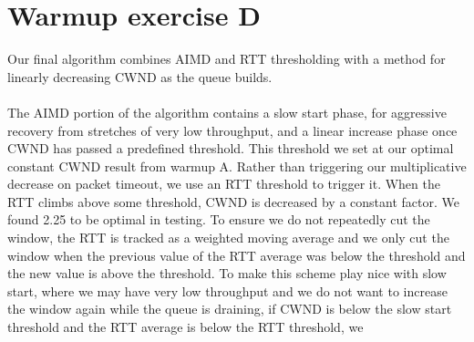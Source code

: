 \documentclass[12pt]{article}
\begin{document}
\section*{Warmup exercise D}
Our final algorithm combines AIMD and RTT thresholding with a method for linearly decreasing CWND as the queue builds. \\ 
\\
The AIMD portion of the algorithm contains a slow start phase, for aggressive recovery from stretches of very low throughput, and a linear increase phase once CWND has passed a predefined threshold. This threshold we set at our optimal constant CWND result from warmup A. Rather than triggering our multiplicative decrease on packet timeout, we use an RTT threshold to trigger it. When the RTT climbs above some threshold, CWND is decreased by a constant factor. We found 2.25 to be optimal in testing. To ensure we do not repeatedly cut the window, the RTT is tracked as a weighted moving average and we only cut the window when the previous value of the RTT average was below the threshold and the new value is above the threshold. To make this scheme play nice with slow start, where we may have very low throughput and we do not want to increase the window again while the queue is draining, if CWND is below the slow start threshold and the RTT average is below the RTT threshold, we 
	
		
\end{document}
